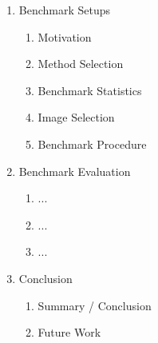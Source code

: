 \begin{enumerate}
	\item Benchmark Setups
	\begin{enumerate}
		\item Motivation
		\item Method Selection
		\item Benchmark Statistics
		\item Image Selection
		\item Benchmark Procedure
	\end{enumerate}
	
	
	\item Benchmark Evaluation
	\begin{enumerate}
		\item ...
		\item ...
		\item ...
	\end{enumerate}
	
	
	\item Conclusion
	\begin{enumerate}
		\item Summary / Conclusion
		\item Future Work
	\end{enumerate}
	
\end{enumerate}
